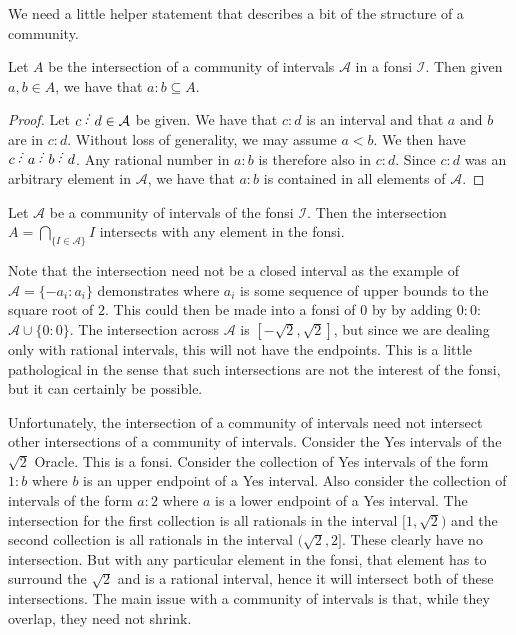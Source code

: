 \documentclass[12pt]{article}
\begin{document}
We need a little helper statement that describes a bit of the structure of a community.

\begin{lemma}
    Let $A$ be the intersection of a community of intervals $\mathcal{A}$ in a fonsi $\mathcal{I}$. Then given $a, b \in A$, we have that $a : b \subseteq A$.
\end{lemma}

\begin{proof}
    Let $c\lte d \in \mathcal{A}$ be given. We have that $c:d$ is an interval and that $a$ and $b$ are in $c:d$. Without loss of generality, we may assume $a < b$.  We then have $c \lte a \lte b \lte d$. Any rational number in $a:b$ is therefore also in $c:d$. Since $c:d$ was an arbitrary element in $\mathcal{A}$, we have that $a:b$ is contained in all elements of $\mathcal{A}$.
\end{proof}

\begin{proposition}\label{pr:fonsi-inf-inter}
Let $\mathcal{A}$ be a community of intervals of the fonsi $\mathcal{I}$. Then the intersection $A = \bigcap_{\{ I \in \mathcal{A}\}} I $ intersects with any element in the fonsi. 
\end{proposition}


Note that the intersection need not be a closed interval as the example of $\mathcal{A} = \{ -a_i : a_i \}$ demonstrates where $a_i$ is some sequence of upper bounds to the square root of $2$. This could then be made into a fonsi of 0 by by adding $0:0$:  $\mathcal{A} \cup \{0:0\}$. The intersection across $\mathcal{A}$ is $[-\sqrt{2}, \sqrt{2}]$, but since we are dealing only with rational intervals, this will not have the endpoints. This is a little pathological in the sense that such intersections are not the interest of the fonsi, but it can certainly be possible. 

Unfortunately, the intersection of a community of intervals need not intersect other intersections of a community of intervals. Consider the Yes intervals of the $\sqrt{2}$ Oracle. This is a fonsi. Consider the collection of Yes intervals of the form $1:b$ where $b$ is an upper endpoint of a Yes interval. Also consider the collection of intervals of the form $a:2$ where $a$ is a lower endpoint of a Yes interval. The intersection for the first collection is all rationals in the interval $[1, \sqrt{2})$ and the second collection is all rationals in the interval $(\sqrt{2}, 2]$. These clearly have no intersection. But with any particular element in the fonsi, that element has to surround the $\sqrt{2}$ and is a rational interval, hence it will intersect both of these intersections. The main issue with a community of intervals is that, while they overlap, they need not shrink. 
\end{document}
